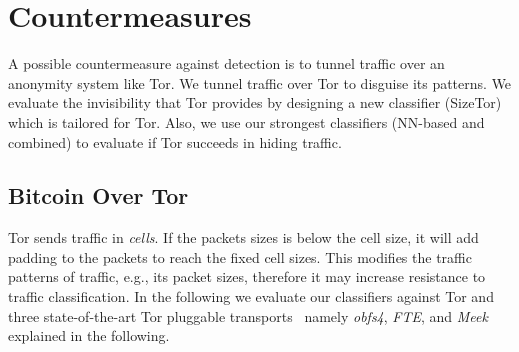 \section{Countermeasures}
A possible countermeasure against \bc detection is to tunnel \bc traffic over 
an anonymity system like Tor. We tunnel \bc traffic over Tor to disguise its patterns. We evaluate the invisibility that Tor provides by designing a new classifier (SizeTor) which is tailored for Tor. Also, we use our strongest classifiers (NN-based and combined) to evaluate if Tor succeeds in hiding \bc traffic.

\subsection{Bitcoin Over Tor}\label{sec:tor}
Tor sends traffic in \textit{cells}. If the packets sizes is below the cell size, it will add padding to the packets to reach the fixed cell sizes. This modifies the traffic patterns of \bc traffic, e.g., its packet sizes, therefore it may increase resistance to traffic classification. 
In the following we evaluate our classifiers against Tor and three state-of-the-art Tor 
pluggable transports~\cite{pluggable-transport} namely \textit{obfs4}, \textit{FTE}, and \textit{Meek} explained in the following. 

